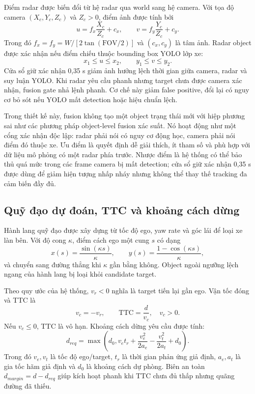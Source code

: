 \documentclass[conference]{IEEEtran}
\begin{document}
Điểm radar được biến đổi từ hệ radar qua world sang hệ camera. Với tọa độ camera $(X_c,Y_c,Z_c)$ và $Z_c>0$, điểm ảnh được tính bởi
\begin{equation}
u=f_x\frac{X_c}{Z_c}+c_x,\qquad v=f_y\frac{Y_c}{Z_c}+c_y.
\label{eq:projection}
\end{equation}
Trong đó $f_x=f_y=W/[2\tan(\mathrm{FOV}/2)]$ và $(c_x,c_y)$ là tâm ảnh. Radar object được xác nhận nếu điểm chiếu thuộc bounding box YOLO lớp xe:
\begin{equation}
x_1\leq u\leq x_2,\qquad y_1\leq v\leq y_2.
\label{eq:association}
\end{equation}
Cửa sổ giữ xác nhận 0,35 s giảm ảnh hưởng lệch thời gian giữa camera, radar và suy luận YOLO. Khi radar yêu cầu phanh nhưng target chưa được camera xác nhận, fusion gate nhả lệnh phanh. Cơ chế này giảm false positive, đổi lại có nguy cơ bỏ sót nếu YOLO mất detection hoặc hiệu chuẩn lệch.

Trong thiết kế này, fusion không tạo một object trạng thái mới với hiệp phương sai như các phương pháp object-level fusion xác suất. Nó hoạt động như một cổng xác nhận độc lập: radar phải nói có nguy cơ động học, camera phải nói điểm đó thuộc xe. Ưu điểm là quyết định dễ giải thích, ít tham số và phù hợp với dữ liệu mô phỏng có một radar phía trước. Nhược điểm là hệ thống có thể bảo thủ quá mức trong các frame camera bị mất detection; cửa sổ giữ xác nhận 0,35 s được dùng để giảm hiện tượng nhấp nháy nhưng không thể thay thế tracking đa cảm biến đầy đủ.

\subsection{Quỹ đạo dự đoán, TTC và khoảng cách dừng}
Hành lang quỹ đạo được xây dựng từ tốc độ ego, yaw rate và góc lái để loại xe làn bên. Với độ cong $\kappa$, điểm cách ego một cung $s$ có dạng
\begin{equation}
x(s)=\frac{\sin(\kappa s)}{\kappa},\qquad y(s)=\frac{1-\cos(\kappa s)}{\kappa},
\label{eq:path}
\end{equation}
và chuyển sang đường thẳng khi $\kappa$ gần bằng không. Object ngoài ngưỡng lệch ngang của hành lang bị loại khỏi candidate target.

Theo quy ước của hệ thống, $v_r<0$ nghĩa là target tiến lại gần ego. Vận tốc đóng và TTC là
\begin{equation}
v_c=-v_r,\qquad \mathrm{TTC}=\frac{d}{v_c},\quad v_c>0.
\label{eq:ttc}
\end{equation}
Nếu $v_c\leq0$, TTC là vô hạn. Khoảng cách dừng yêu cầu được tính:
\begin{equation}
d_{req}=\max\left(d_0,v_e t_r+\frac{v_e^2}{2a_e}-\frac{v_t^2}{2a_t}+d_0\right).
\label{eq:stopping}
\end{equation}
Trong đó $v_e,v_t$ là tốc độ ego/target, $t_r$ là thời gian phản ứng giả định, $a_e,a_t$ là gia tốc hãm giả định và $d_0$ là khoảng cách dự phòng. Biên an toàn $d_{margin}=d-d_{req}$ giúp kích hoạt phanh khi TTC chưa đủ thấp nhưng quãng đường đã thiếu.
\end{document}
